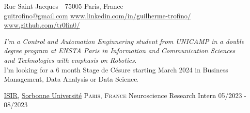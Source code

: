 \documentclass[10pt, a4paper]{article}
\begin{document}
 



 Rue Saint-Jacques - 75005 Paris, France\\         %
\href{mailto:guitrofino@gmail.com}{guitrofino@gmail.com}\bull   %
\href{https://www.linkedin.com/in/guilherme-trofino/}{www.linkedin.com/in/guilherme-trofino/}\bull %
\href{https://github.com/tr0fin0}{www.github.com/tr0fin0/}       %

\spacedhrule{0.9em}{-0.4em}



\begin{multicols}{2}
\noindent \textit{I'm a Control and Automation Enginnering student from UNICAMP in a double degree program at ENSTA Paris in Information and Communication Sciences and Technologies with emphasis on Robotics.}\\

\noindent I'm looking for a 6 month Stage de Césure starting March 2024 in Business Management, Data Analysis or Data Science.
\end{multicols}

\spacedhrule{0.5em}{-0.4em}



\headedsection
    {\href{https://www.isir.upmc.fr/?lang=en}{ISIR}, \href{https://www.sorbonne-universite.fr/}{Sorbonne Université}}
    {\textsc{Paris, France}}
    {
        \headedsubsection
        {Neuroscience Research Intern}
        {05/2023 - 08/2023}
        {}
    }
\end{document}
